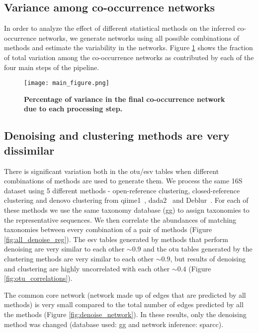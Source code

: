   \FloatBarrier

  \subsection*{Variance among co-occurrence networks}

  In order to analyze the effect of different statistical methods on the inferred co-occurrence networks, we generate networks using all possible combinations of methods and estimate the variability in the networks.
  Figure \ref{fig:variance} shows the fraction of total variation among the co-occurrence networks as contributed by each of the four main steps of the pipeline.

  \begin{figure}[h]
    \centering
    \texttt{[image: main\_figure.png]}
    \caption{\textbf{Percentage of variance in the final co-occurrence network due to each processing step.}}%
    \label{fig:variance}
  \end{figure}


  \FloatBarrier

  \subsection*{Denoising and clustering methods are very dissimilar}

  There is significant variation both in the \ac{otu}/\ac{esv} tables when different combinations of methods are used to generate them.
  We process the same 16S dataset using 5 different methods - open-reference clustering, closed-reference clustering and denovo clustering from \ac{qiime1}~\cite{Caporaso2010}, \ac{dada2}~\cite{Callahan2016} and Deblur~\cite{Amir2017}.
  For each of these methods we use the same taxonomy database (\ac{gg}) to assign taxonomies to the representative sequences.
  We then correlate the abundances of matching taxonomies between every combination of a pair of methods (Figure \ref{fig:all_denoise_reg}).
  The \ac{esv} tables generated by methods that perform denoising are very similar to each other $\sim0.9$ and the \ac{otu} tables generated by the clustering methods are very similar to each other $\sim0.9$, but results of denoising and clustering are highly uncorrelated with each other $\sim0.4$ (Figure \ref{fig:otu_correlations}).

  The common core network (network made up of edges that are predicted by all methods) is very small compared to the total number of edges predicted by all the methods (Figure \ref{fig:denoise_network}).
  In these results, only the denoising method was changed (database used: \ac{gg} and network inference: \ac{sparcc}).


